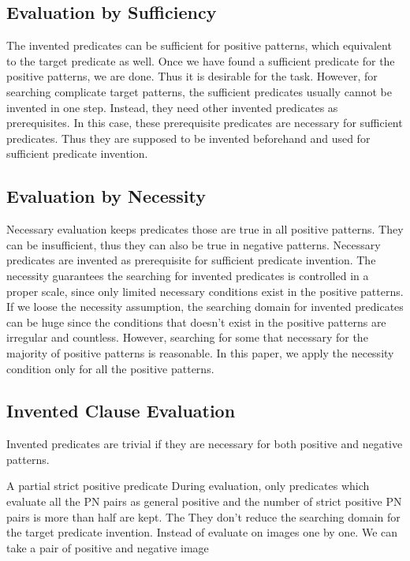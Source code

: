 \documentclass[
]{ceurart}
\begin{document}
\subsection{Evaluation by Sufficiency}
The invented predicates can be sufficient for positive patterns, which equivalent to the target predicate as well. Once we have found a sufficient predicate for the positive patterns, we are done. Thus it is desirable for the task. 
However, for searching complicate target patterns, the sufficient predicates usually cannot be invented in one step. Instead, they need other invented predicates as prerequisites. In this case, these prerequisite predicates are necessary for sufficient predicates. Thus they are supposed to be invented beforehand and used for sufficient predicate invention.

\subsection{Evaluation by Necessity} 
 Necessary evaluation keeps predicates those are true in all positive patterns. They can be insufficient, thus they can also be true in negative patterns. Necessary predicates are invented as prerequisite for sufficient predicate invention.
The necessity guarantees the searching for invented predicates is controlled in a proper scale, since only limited necessary conditions exist in the positive patterns. 
If we loose the necessity assumption, the searching domain for invented predicates can be huge since the conditions that doesn't exist in the positive patterns are irregular and  countless. 
However, searching for some that necessary for the majority of positive patterns is reasonable. In this paper, we apply the necessity condition only for all the positive patterns.%



\subsection{Invented Clause Evaluation}


Invented predicates are trivial if they are necessary for both positive and negative patterns. 

A partial strict positive predicate 
During evaluation, only predicates which evaluate all the PN pairs as general positive and the number of strict positive PN pairs is more than half are kept. The 
They don't reduce the searching domain for the target predicate invention.  
Instead of evaluate on images  one by one. 
We can take a pair of positive and negative image 
\end{document}

